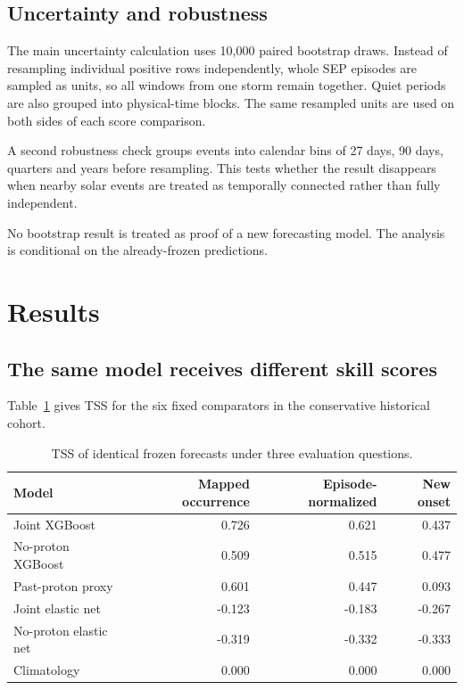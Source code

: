 \documentclass[11pt]{article}
\begin{document}
\subsection{Uncertainty and robustness}

The main uncertainty calculation uses 10,000 paired bootstrap draws. Instead of resampling individual positive rows independently, whole SEP episodes are sampled as units, so all windows from one storm remain together. Quiet periods are also grouped into physical-time blocks. The same resampled units are used on both sides of each score comparison.

A second robustness check groups events into calendar bins of 27 days, 90 days, quarters and years before resampling. This tests whether the result disappears when nearby solar events are treated as temporally connected rather than fully independent.

No bootstrap result is treated as proof of a new forecasting model. The analysis is conditional on the already-frozen predictions.

\section{Results}

\subsection{The same model receives different skill scores}

Table~\ref{tab:tss} gives TSS for the six fixed comparators in the conservative historical cohort.

\begin{table}[H]
\centering
\caption{TSS of identical frozen forecasts under three evaluation questions.}
\label{tab:tss}
\begin{tabular}{lrrr}
\toprule
Model & Mapped occurrence & Episode-normalized & New onset \\
\midrule
Joint XGBoost & 0.726 & 0.621 & 0.437 \\
No-proton XGBoost & 0.509 & 0.515 & 0.477 \\
Past-proton proxy & 0.601 & 0.447 & 0.093 \\
Joint elastic net & -0.123 & -0.183 & -0.267 \\
No-proton elastic net & -0.319 & -0.332 & -0.333 \\
Climatology & 0.000 & 0.000 & 0.000 \\
\bottomrule
\end{tabular}
\end{table}
\end{document}
